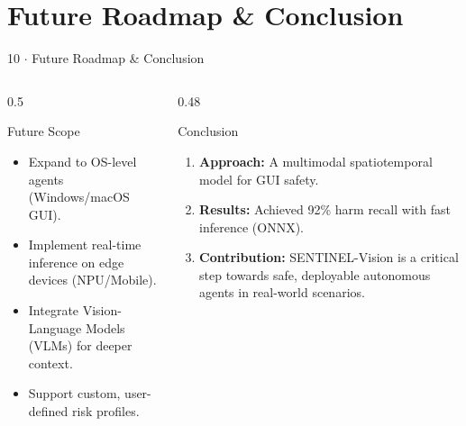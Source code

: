 \documentclass[aspectratio=169, 10pt]{beamer}
\begin{document}
\section{Future Roadmap \& Conclusion}

\begin{frame}{10 $\cdot$ Future Roadmap \& Conclusion}

    \begin{columns}[T]

        \begin{column}{0.5\textwidth}

            \begin{block}{Future Scope}

                \begin{itemize}
                    \item Expand to OS-level agents (Windows/macOS GUI).
                    \item Implement real-time inference on edge devices (NPU/Mobile).
                    \item Integrate Vision-Language Models (VLMs) for deeper context.
                    \item Support custom, user-defined risk profiles.
                \end{itemize}

            \end{block}

        \end{column}

        \begin{column}{0.48\textwidth}

            \begin{exampleblock}{Conclusion}

                \begin{enumerate}
                    \item \textbf{Approach:} A multimodal spatiotemporal model for GUI safety.
                    \item \textbf{Results:} Achieved 92\% harm recall with fast inference (ONNX).
                    \item \textbf{Contribution:} SENTINEL-Vision is a critical step towards safe, deployable autonomous agents in real-world scenarios.
                \end{enumerate}

            \end{exampleblock}

        \end{column}

    \end{columns}

\end{frame}
\end{document}

